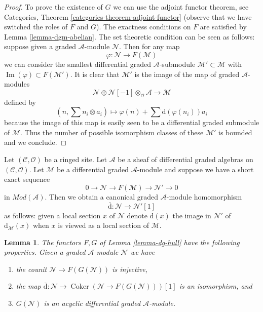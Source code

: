 \documentclass{stacks-project}
\theoremstyle{plain}
\newtheorem{lemma}[subsection]{Lemma}
\theoremstyle{definition}
\theoremstyle{remark}
\numberwithin{equation}{subsection}
\def\Im{\mathop{\mathrm{Im}}}
\def\Coker{\mathop{\mathrm{Coker}}}
\begin{document}
\begin{proof}
To prove the existence of $G$ we can use the adjoint functor theorem, see
Categories, Theorem \ref{categories-theorem-adjoint-functor} (observe that
we have switched the roles of $F$ and $G$). The exactness conditions on
$F$ are satisfied by Lemma \ref{lemma-dgm-abelian}. The set theoretic
condition can be seen as follows: suppose given a graded $\mathcal{A}$-module
$\mathcal{N}$. Then for any map
$$
\varphi : \mathcal{N} \longrightarrow F(\mathcal{M})
$$
we can consider the smallest differential graded $\mathcal{A}$-submodule
$\mathcal{M}' \subset \mathcal{M}$ with
$\Im(\varphi) \subset F(\mathcal{M}')$.
It is clear that $\mathcal{M}'$ is the image of the map
of graded $\mathcal{A}$-modules
$$
\mathcal{N} \oplus
\mathcal{N}[-1] \otimes_\mathcal{O} \mathcal{A}
\longrightarrow
\mathcal{M}
$$
defined by
$$
(n, \sum n_i \otimes a_i) \longmapsto
\varphi(n) + \sum \text{d}(\varphi(n_i)) a_i
$$
because the image of this map is easily seen to be a differential graded
submodule of $\mathcal{M}$.
Thus the number of possible isomorphism classes of these $\mathcal{M}'$
is bounded and we conclude.
\end{proof}

\noindent
Let $(\mathcal{C}, \mathcal{O})$ be a ringed site.
Let $\mathcal{A}$ be a sheaf of differential graded algebras
on $(\mathcal{C}, \mathcal{O})$. Let $\mathcal{M}$ be a differential
graded $\mathcal{A}$-module and suppose we have a short exact sequence
$$
0 \to \mathcal{N} \to F(\mathcal{M}) \to \mathcal{N}' \to 0
$$
in $\textit{Mod}(\mathcal{A})$. Then we obtain a canonical
graded $\mathcal{A}$-module homomorphism
$$
\overline{\text{d}} : \mathcal{N} \to \mathcal{N}'[1]
$$
as follows: given a local section $x$ of $\mathcal{N}$ denote
$\overline{\text{d}}(x)$ the image in $\mathcal{N}'$ of
$\text{d}_\mathcal{M}(x)$ when $x$ is viewed as a local section
of $\mathcal{M}$.

\begin{lemma}
\label{lemma-dg-hull-acyclic}
The functors $F, G$ of Lemma \ref{lemma-dg-hull} have
the following properties. Given a graded $\mathcal{A}$-module
$\mathcal{N}$ we have
\begin{enumerate}
\item the counit $\mathcal{N} \to F(G(\mathcal{N}))$ is injective,
\item the map $\overline{\text{d}} : \mathcal{N} \to
\Coker(\mathcal{N} \to F(G(\mathcal{N})))[1]$ is an isomorphism, and
\item $G(\mathcal{N})$ is an acyclic differential graded $\mathcal{A}$-module.
\end{enumerate}
\end{lemma}
\end{document}
